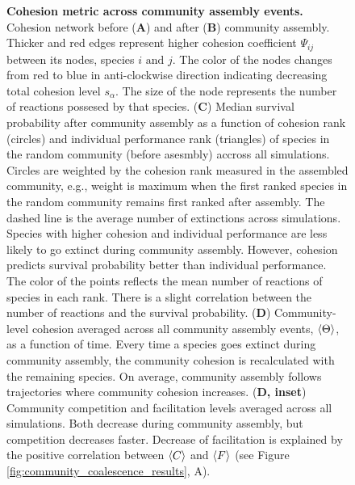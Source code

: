 \documentclass[titlepage,11pt]{article}
\begin{document}
\begin{linenumbers}
\begin{singlespace}
\begin{figure}
						\caption{\textbf{Cohesion metric across community assembly events.} Cohesion network before (\textbf{A}) and after (\textbf{B}) community assembly. Thicker and red edges represent higher  cohesion coefficient $ \Psi_{ij} $ between its nodes, species $ i \text{ and } j $. The color of the nodes changes from red to blue in anti-clockwise direction indicating decreasing total cohesion level $ s_{\alpha} $. The size of the node represents the number of reactions possesed by that species. (\textbf{C}) Median survival probability after community assembly as a function of cohesion rank (circles) and individual performance rank (triangles) of species in the random community (before asesmbly) accross all simulations. Circles are weighted by the cohesion rank measured in the assembled community, e.g., weight is maximum when the first ranked species in the random community remains first ranked after assembly. The dashed line is the average number of extinctions across simulations. Species with higher cohesion and individual performance are less likely to go extinct during community assembly. However, cohesion predicts survival probability better than individual performance. The color of the points reflects the mean number of reactions of species in each rank. There is a slight correlation between the number of reactions and the survival probability. (\textbf{D})  Community-level cohesion averaged across all community assembly events,  $\braket{\Theta} $, as a function of time. Every time a species goes extinct during community assembly, the community cohesion is recalculated with the remaining species. On average, community assembly follows trajectories where community cohesion increases. (\textbf{D, inset}) Community competition and facilitation levels averaged across all simulations. Both decrease during community assembly, but competition decreases faster. Decrease of facilitation is explained by the positive correlation between $ \braket{C} $ and $ \braket{F} $ (see Figure \ref{fig:community_coalescence_results}, A).}
						\label{fig:interaction_evolution}
					\end{figure}

\end{singlespace}
\end{linenumbers}
\end{document}
